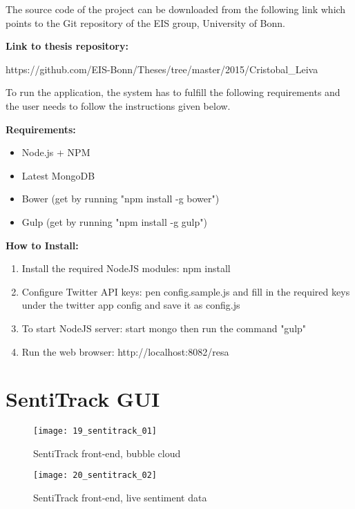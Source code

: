 The source code of the project can be downloaded from the following link which points to
the Git repository of the EIS group, University of Bonn. 

\textbf{Link to thesis repository: }

https://github.com/EIS-Bonn/Theses/tree/master/2015/Cristobal\_Leiva

To run the application, the system has to fulfill the following requirements and the user
needs to follow the instructions given below.

\textbf{Requirements:}

\begin{itemize} 
\itemsep0em  

\item Node.js + NPM

\item Latest MongoDB

\item Bower (get by running "npm install -g bower")

\item Gulp (get by running "npm install -g gulp")


\end{itemize}

\textbf{How to Install:}

\begin{enumerate} 
\itemsep0em  

\item Install the required NodeJS modules: npm install

\item Configure Twitter API keys: pen config.sample.js and fill in the required keys under the twitter app
config and save it as config.js

\item To start NodeJS server: start mongo then run the command "gulp"

\item Run the web browser: http://localhost:8082/resa


\end{enumerate}

\clearpage
\section{SentiTrack GUI}

\begin{figure}[H]
    \centering
    \caption{SentiTrack front-end, bubble cloud}
    \texttt{[image: 19\_sentitrack\_01]}
    \label{}
\end{figure}

\begin{figure}[H]
    \centering
    \caption{SentiTrack front-end, live sentiment data}
    \texttt{[image: 20\_sentitrack\_02]}
    \label{}
\end{figure}

